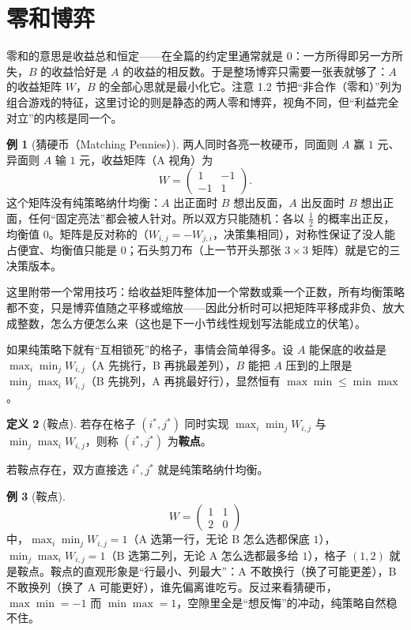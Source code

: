 \documentclass[UTF8,a4paper,11pt,oneside,openany,fontset=fandol]{ctexbook}
\theoremstyle{definition}
\newtheorem{definition}{定义}[chapter]
\newtheorem{example}[definition]{例}
\begin{document}
\section{零和博弈}
零和的意思是收益总和恒定——在全篇的约定里通常就是 $0$：一方所得即另一方所失，$B$ 的收益恰好是 $A$ 的收益的相反数。于是整场博弈只需要一张表就够了：$A$ 的收益矩阵 $W$，$B$ 的全部心思就是最小化它。注意 1.2 节把“非合作（零和）”列为组合游戏的特征，这里讨论的则是静态的两人零和博弈，视角不同，但“利益完全对立”的内核是同一个。

\begin{example}[猜硬币（Matching Pennies）]\label{ex:pennies}
两人同时各亮一枚硬币，同面则 $A$ 赢 $1$ 元、异面则 $A$ 输 $1$ 元，收益矩阵（A 视角）为
\[
 W=\begin{pmatrix}1&-1\\-1&1\end{pmatrix}.
\]
这个矩阵没有纯策略纳什均衡：$A$ 出正面时 $B$ 想出反面，$A$ 出反面时 $B$ 想出正面，任何“固定亮法”都会被人针对。所以双方只能随机：各以 $\tfrac12$ 的概率出正反，均衡值 $0$。矩阵是反对称的（$W_{i,j}=-W_{j,i}$，决策集相同），对称性保证了没人能占便宜、均衡值只能是 $0$；石头剪刀布（上一节开头那张 $3\times3$ 矩阵）就是它的三决策版本。
\end{example}

这里附带一个常用技巧：给收益矩阵整体加一个常数或乘一个正数，所有均衡策略都不变，只是博弈值随之平移或缩放——因此分析时可以把矩阵平移成非负、放大成整数，怎么方便怎么来（这也是下一小节线性规划写法能成立的伏笔）。

如果纯策略下就有“互相锁死”的格子，事情会简单得多。设 $A$ 能保底的收益是 $\max_i\min_j W_{i,j}$（A 先挑行，B 再挑最差列），$B$ 能把 $A$ 压到的上限是 $\min_j\max_i W_{i,j}$（B 先挑列，A 再挑最好行），显然恒有 $\max\min\le\min\max$。

\begin{definition}[鞍点]
若存在格子 $(i^*,j^*)$ 同时实现 $\max_i\min_j W_{i,j}$ 与 $\min_j\max_i W_{i,j}$，则称 $(i^*,j^*)$ 为\textbf{鞍点}。
\end{definition}

若鞍点存在，双方直接选 $i^*,j^*$ 就是纯策略纳什均衡。

\begin{example}[鞍点]
\[
 W=\begin{pmatrix}1&1\\2&0\end{pmatrix}
\]
中，$\max_i\min_j W_{i,j}=1$（A 选第一行，无论 B 怎么选都保底 $1$），$\min_j\max_i W_{i,j}=1$（B 选第二列，无论 A 怎么选都最多给 $1$），格子 $(1,2)$ 就是鞍点。鞍点的直观形象是“行最小、列最大”：A 不敢换行（换了可能更差），B 不敢换列（换了 A 可能更好），谁先偏离谁吃亏。反过来看猜硬币，$\max\min=-1$ 而 $\min\max=1$，空隙里全是“想反悔”的冲动，纯策略自然稳不住。
\end{example}
\end{document}
